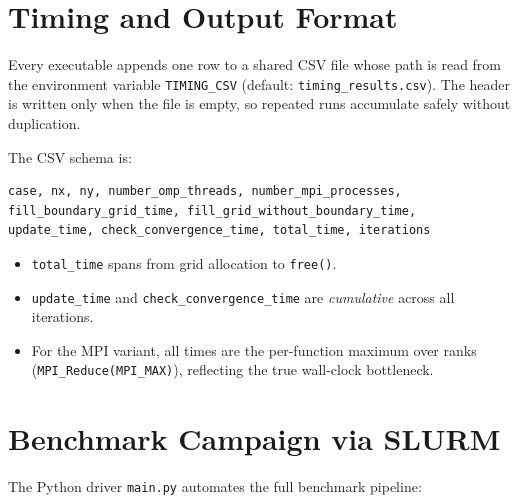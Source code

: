 \documentclass[11pt,a4paper]{article}
\begin{document}
\section{Timing and Output Format}

Every executable appends one row to a shared CSV file whose path is
read from the environment variable \texttt{TIMING\_CSV} (default:
\texttt{timing\_results.csv}).  The header is written only when the file
is empty, so repeated runs accumulate safely without duplication.

The CSV schema is:
\begin{verbatim}
case, nx, ny, number_omp_threads, number_mpi_processes,
fill_boundary_grid_time, fill_grid_without_boundary_time,
update_time, check_convergence_time, total_time, iterations
\end{verbatim}

\begin{itemize}
  \item \texttt{total\_time} spans from grid allocation to \texttt{free()}.
  \item \texttt{update\_time} and \texttt{check\_convergence\_time} are
        \emph{cumulative} across all iterations.
  \item For the MPI variant, all times are the per-function maximum over ranks
        (\texttt{MPI\_Reduce(MPI\_MAX)}), reflecting the true wall-clock
        bottleneck.
\end{itemize}

\section{Benchmark Campaign via SLURM}

The Python driver \texttt{main.py} automates the full benchmark pipeline:
\end{document}

